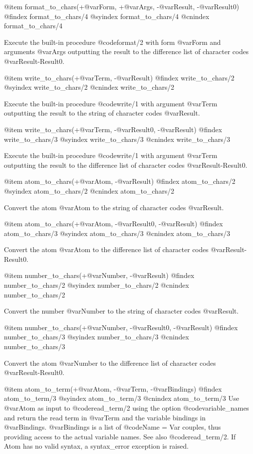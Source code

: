 {{{{{{{{@item format_to_chars(+@var{Form}, +@var{Args}, -@var{Result}, -@var{Result0})
@findex format_to_chars/4
@syindex format_to_chars/4
@cnindex format_to_chars/4

Execute the built-in procedure @code{format/2} with form @var{Form} and
arguments @var{Args} outputting the result to the difference list of
character codes @var{Result-Result0}.

@item write_to_chars(+@var{Term}, -@var{Result})
@findex write_to_chars/2
@syindex write_to_chars/2
@cnindex write_to_chars/2

Execute the built-in procedure @code{write/1} with argument @var{Term}
outputting the result to the string of character codes @var{Result}.

@item write_to_chars(+@var{Term}, -@var{Result0}, -@var{Result})
@findex write_to_chars/3
@syindex write_to_chars/3
@cnindex write_to_chars/3

Execute the built-in procedure @code{write/1} with argument @var{Term}
outputting the result to the difference list of character codes
@var{Result-Result0}.

@item atom_to_chars(+@var{Atom}, -@var{Result})
@findex atom_to_chars/2
@syindex atom_to_chars/2
@cnindex atom_to_chars/2

Convert the atom @var{Atom} to the string of character codes
@var{Result}.

@item atom_to_chars(+@var{Atom}, -@var{Result0}, -@var{Result})
@findex atom_to_chars/3
@syindex atom_to_chars/3
@cnindex atom_to_chars/3

Convert the atom @var{Atom} to the difference list of character codes
@var{Result-Result0}.

@item number_to_chars(+@var{Number}, -@var{Result})
@findex number_to_chars/2
@syindex number_to_chars/2
@cnindex number_to_chars/2

Convert the number @var{Number} to the string of character codes
@var{Result}.

@item number_to_chars(+@var{Number}, -@var{Result0}, -@var{Result})
@findex number_to_chars/3
@syindex number_to_chars/3
@cnindex number_to_chars/3

Convert the atom @var{Number} to the difference list of character codes
@var{Result-Result0}.

@item atom_to_term(+@var{Atom}, -@var{Term}, -@var{Bindings})
@findex atom_to_term/3
@syindex atom_to_term/3
@cnindex atom_to_term/3
Use @var{Atom} as input to @code{read_term/2} using the option @code{variable_names} and return the read term in @var{Term} and the variable bindings in @var{Bindings}. @var{Bindings} is a list of @code{Name = Var} couples, thus providing access to the actual variable names. See also @code{read_term/2}. If Atom has no valid syntax, a syntax_error exception is raised.

}}}}}}}}
